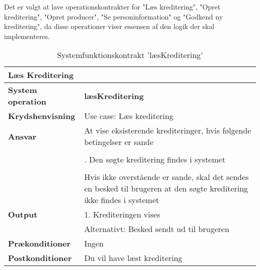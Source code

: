 \noindent
Det er valgt at lave operationskontrakter for "Læs kreditering", "Opret kreditering", "Opret producer", "Se personinformation" og "Godkend ny kreditering", da disse operationer viser essensen af den logik der skal implementeres. 


\begin{table}[ht]
    \begin{tabularx}{\textwidth}{|p{4cm}|X|}
        \hline
        \multicolumn{2}{|X|}{\textbf{Læs Kreditering}}\\ 
        \hline
        \textbf{System operation}       & \textbf{læsKreditering} \\ \hline
        \textbf{Krydshenvisning}        & Use case: Læs kreditering \\ \hline
        \textbf{Ansvar}                 & At vise eksisterende krediteringer, hvis følgende betingelser er sande \\ 
                                        & \\
                                        & \quad 1. Den søgte kreditering findes i systemet\\
                                        & \\
                                        & Hvis ikke overstående er sande, skal det sendes en besked til brugeren at den søgte kreditering ikke findes i systemet\\\hline
        \textbf{Output}                 & 1. Krediteringen vises\\ 
                                        & Alternativt: Besked sendt ud til brugeren\\ \hline
        \textbf{Prækonditioner}         & Ingen \\ \hline
        \textbf{Postkonditioner}        & Du vil have læst kreditering \\ \hline
    \end{tabularx}
    \caption{Systemfunktionskontrakt 'læsKreditering'}
    \label{tab:kontrakter_læs_kreditering}
\end{table}


